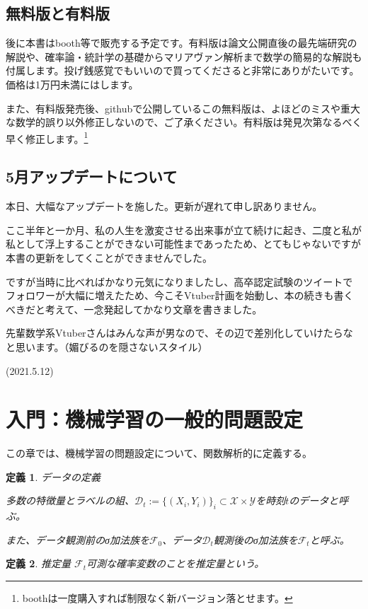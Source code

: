 \documentclass{jsarticle}
\newtheorem{defi}{定義}[section]
\begin{document}
\subsection{無料版と有料版}
後に本書はbooth等で販売する予定です。有料版は論文公開直後の最先端研究の解説や、確率論・統計学の基礎からマリアヴァン解析まで数学の簡易的な解説も付属します。投げ銭感覚でもいいので買ってくださると非常にありがたいです。価格は1万円未満にはします。

また、有料版発売後、githubで公開しているこの無料版は、よほどのミスや重大な数学的誤り以外修正しないので、ご了承ください。有料版は発見次第なるべく早く修正します。\footnote{boothは一度購入すれば制限なく新バージョン落とせます。}

\subsection{5月アップデートについて}
本日、大幅なアップデートを施した。更新が遅れて申し訳ありません。

ここ半年と一か月、私の人生を激変させる出来事が立て続けに起き、二度と私が私として浮上することができない可能性まであったため、とてもじゃないですが本書の更新をしてくことができませんでした。

ですが当時に比べればかなり元気になりましたし、高卒認定試験のツイートでフォロワーが大幅に増えたため、今こそVtuber計画を始動し、本の続きも書くべきだと考えて、一念発起してかなり文章を書きました。

先輩数学系Vtuberさんはみんな声が男なので、その辺で差別化していけたらなと思います。（媚びるのを隠さないスタイル）

(2021.5.12)


\newpage





\section{入門：機械学習の一般的問題設定}

この章では、機械学習の問題設定について、関数解析的に定義する。

\begin{defi} データの定義

多数の特徴量とラベルの組、$\mathcal{D}_t:=\{(X_i,Y_i)\}_i\subset \mathcal{X}\times \mathcal{Y}$を時刻$t$のデータと呼ぶ。

また、データ観測前のσ加法族を$\mathcal{F}_0$、データ$\mathcal{D}_t$観測後のσ加法族を$\mathcal{F}_t$と呼ぶ。


\end{defi}
\begin{defi} 推定量
$\mathcal{F}_t$可測な確率変数のことを推定量という。
\end{defi}
\end{document}
